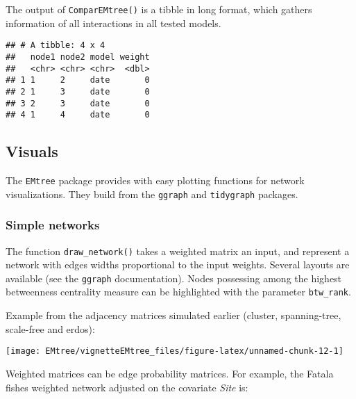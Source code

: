 The output of \texttt{ComparEMtree()} is a tibble in long format, which
gathers information of all interactions in all tested models.

\begin{Shaded}
\begin{Highlighting}[]
\NormalTok{)}
\end{Highlighting}
\end{Shaded}

\begin{verbatim}
## # A tibble: 4 x 4
##   node1 node2 model weight
##   <chr> <chr> <chr>  <dbl>
## 1 1     2     date       0
## 2 1     3     date       0
## 3 2     3     date       0
## 4 1     4     date       0
\end{verbatim}

\subsection{Visuals}\label{visuals}

The \texttt{EMtree} package provides with easy plotting functions for network
visualizations. They build from the \texttt{ggraph} and
\texttt{tidygraph} packages.

\subsubsection{Simple networks}\label{simple-networks}

The function \texttt{draw\_network()} takes a weighted matrix an input,
and represent a network with edges widths proportional to the input
weights. Several layouts are available (see the \texttt{ggraph}
documentation). Nodes possessing among the highest betweenness
centrality measure can be highlighted with the parameter
\texttt{btw\_rank}.

Example from the adjacency matrices simulated earlier (cluster, spanning-tree, scale-free and erdos):

\begin{center}\texttt{[image: EMtree/vignetteEMtree\_files/figure-latex/unnamed-chunk-12-1]} \end{center}

Weighted matrices can be edge probability matrices. For example, the Fatala fishes weighted network adjusted on the covariate
\textit{Site} is:

\begin{Shaded}
\begin{Highlighting}[]
\NormalTok{probs[probs}\OperatorTok{<}\OperatorTok{/}\NormalTok{p]=} 
\NormalTok{, }\NormalTok{, }
\NormalTok{,}\NormalTok{)}\OperatorTok{\$}
\end{Highlighting}
\end{Shaded}

